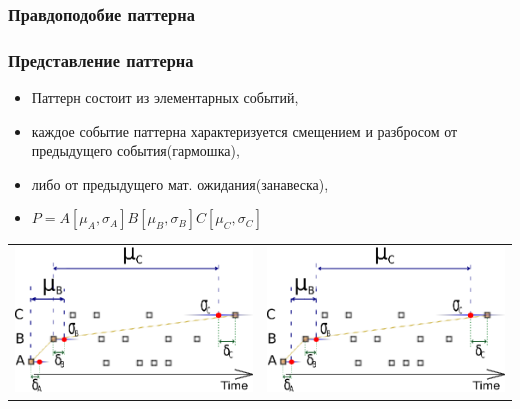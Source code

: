 \documentclass[smaller]{beamer}
\begin{document}
\subsubsection{Правдоподобие паттерна}
\begin{frame}
\frametitle{Представление паттерна}
 \begin{itemize}
  \item Паттерн состоит из элементарных событий,
  \item каждое событие паттерна характеризуется смещением и разбросом от предыдущего события(гармошка),
  \item либо от предыдущего мат. ожидания(занавеска),
  \item $P=A[\mu_A,\sigma_A]B[\mu_B,\sigma_B]C[\mu_C,\sigma_C]$
 \end{itemize}
\begin{left}
\begin{tabular}[t]{p{12em}|p{12em}}
    \includegraphics[scale=0.6]{il1.eps} & \includegraphics[scale=0.6]{il2.eps}\\
\end{tabular}
\end{left}
\end{frame}  
\end{document}

